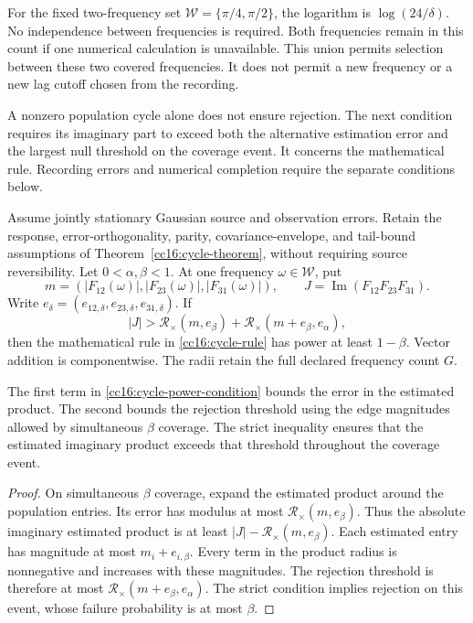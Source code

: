 For the fixed two-frequency set $\mathcal W=\{\pi/4,\pi/2\}$, the logarithm is $\log(24/\delta)$. No independence between frequencies is required. Both frequencies remain in this count if one numerical calculation is unavailable. This union permits selection between these two covered frequencies. It does not permit a new frequency or a new lag cutoff chosen from the recording.

A nonzero population cycle alone does not ensure rejection. The next condition requires its imaginary part to exceed both the alternative estimation error and the largest null threshold on the coverage event. It concerns the mathematical rule. Recording errors and numerical completion require the separate conditions below.

\begin{theorem}
\label{cc16:cycle-power}
Assume jointly stationary Gaussian source and observation errors. Retain the response, error-orthogonality, parity, covariance-envelope, and tail-bound assumptions of Theorem~\ref{cc16:cycle-theorem}, without requiring source reversibility. Let $0<\alpha,\beta<1$. At one frequency $\omega\in\mathcal W$, put
\[
 m=(|F_{12}(\omega)|,|F_{23}(\omega)|,|F_{31}(\omega)|),
 \qquad J=\operatorname{Im}(F_{12}F_{23}F_{31}).
\]
Write $e_\delta=(e_{12,\delta},e_{23,\delta},e_{31,\delta})$. If
\begin{equation}
 |J|>\mathcal R_\times(m,e_\beta)
       +\mathcal R_\times(m+e_\beta,e_\alpha),
 \label{cc16:cycle-power-condition}
\end{equation}
then the mathematical rule in \eqref{cc16:cycle-rule} has power at least $1-\beta$. Vector addition is componentwise. The radii retain the full declared frequency count $G$.
\end{theorem}

The first term in \eqref{cc16:cycle-power-condition} bounds the error in the estimated product. The second bounds the rejection threshold using the edge magnitudes allowed by simultaneous $\beta$ coverage. The strict inequality ensures that the estimated imaginary product exceeds that threshold throughout the coverage event.

\begin{proof}
On simultaneous $\beta$ coverage, expand the estimated product around the population entries. Its error has modulus at most $\mathcal R_\times(m,e_\beta)$. Thus the absolute imaginary estimated product is at least $|J|-\mathcal R_\times(m,e_\beta)$. Each estimated entry has magnitude at most $m_i+e_{i,\beta}$. Every term in the product radius is nonnegative and increases with these magnitudes. The rejection threshold is therefore at most $\mathcal R_\times(m+e_\beta,e_\alpha)$. The strict condition implies rejection on this event, whose failure probability is at most $\beta$.
\end{proof}

